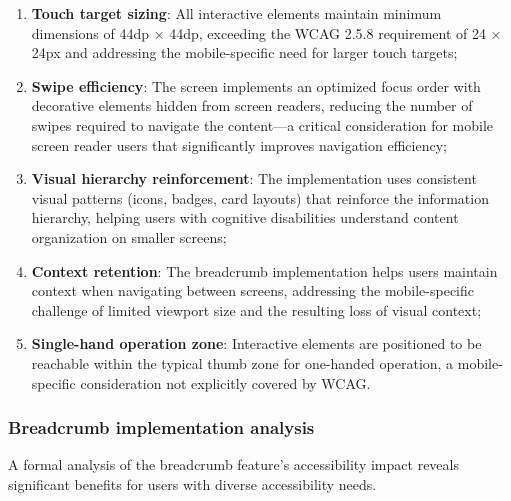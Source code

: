 \begin{enumerate}
    \item \textbf{Touch target sizing}: All interactive elements maintain minimum dimensions of 44dp × 44dp, exceeding the WCAG 2.5.8 requirement of 24 × 24px and addressing the mobile-specific need for larger touch targets;
    
    \item \textbf{Swipe efficiency}: The screen implements an optimized focus order with decorative elements hidden from screen readers, reducing the number of swipes required to navigate the content—a critical consideration for mobile screen reader users that significantly improves navigation efficiency;
    
    \item \textbf{Visual hierarchy reinforcement}: The implementation uses consistent visual patterns (icons, badges, card layouts) that reinforce the information hierarchy, helping users with cognitive disabilities understand content organization on smaller screens;
    
    \item \textbf{Context retention}: The breadcrumb implementation helps users maintain context when navigating between screens, addressing the mobile-specific challenge of limited viewport size and the resulting loss of visual context;
    
    \item \textbf{Single-hand operation zone}: Interactive elements are positioned to be reachable within the typical thumb zone for one-handed operation, a mobile-specific consideration not explicitly covered by WCAG.
\end{enumerate}

\subsubsection{Breadcrumb implementation analysis}

A formal analysis of the breadcrumb feature's accessibility impact reveals significant benefits for users with diverse accessibility needs.

